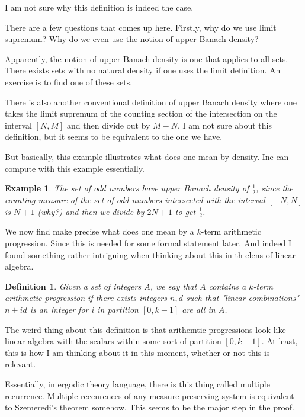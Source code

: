 \documentclass[12pt]{article}
\newtheorem{definition}{Definition}
\newtheorem{example}{Example}
\begin{document}
I am not sure why this definition is indeed the case.

There are a few questions that comes up here. Firstly, why do we use limit supremum? Why do we even use the notion of upper Banach density?

Apparently, the notion of upper Banach density is one that applies to all sets. There exists sets with no natural density if one uses the limit definition. An exercise is to find one of these sets.

There is also another conventional definition of upper Banach density where one takes the limit supremum of the counting section of the intersection on the interval $[N,M]$ and then divide out by $M - N$. I am not sure about this definition, but it seems to be equivalent to the one we have.

But basically, this example illustrates what does one mean by density. Ine can compute with this example essentially.

\begin{example}
    The set of odd numbers have upper Banach density of $\frac{1}{2}$, since the counting measure of the set of odd numbers intersected with the interval $[-N, N]$ is $N + 1$ (why?) and then we divide by $2N + 1$ to get $\frac{1}{2}$.
\end{example}

We now find make precise what does one mean by a $k$-term arithmetic progression. Since this is needed for some formal statement later. And indeed I found something rather intriguing when thinking about this in th elens of linear algebra.

\begin{definition}
    Given a set of integers $A$, we say that $A$ contains a $k$-term arithmetic progression if there exists integers $n, d$ such that "linear combinations" $n + id$ is an integer for $i$ in partition $[0, k-1]$ are all in $A$.
\end{definition}

The weird thing about this definition is that arithemtic progressions look like linear algebra with the scalars within some sort of partition $[0, k-1]$. At least, this is how I am thinking about it in this moment, whether or not this is relevant.

Essentially, in ergodic theory language, there is this thing called multiple recurrence. Multiple reccurences of any measure preserving system is equivalent to Szemeredi's theorem somehow. This seems to be the major step in the proof.
\end{document}
